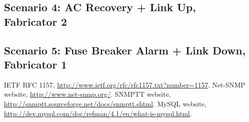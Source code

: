 \documentclass[10pt,a4paper]{report}
\begin{document}
\subsection{Scenario 4: AC Recovery + Link Up, Fabricator 2} 
\subsection{Scenario 5: Fuse Breaker Alarm + Link Down, Fabricator 1} 

 \begin{thebibliography}{9}
IETF RFC 1157, \url{http://www.ietf.org/rfc/rfc1157.txt?number=1157}.
Net-SNMP website, \url{http://www.net-snmp.org/}.
SNMPTT website, \url{http://snmptt.sourceforge.net/docs/snmptt.shtml}.
MySQL website, \url{http://dev.mysql.com/doc/refman/4.1/en/what-is-mysql.html}.

 
\end{thebibliography}
    
\end{document}
